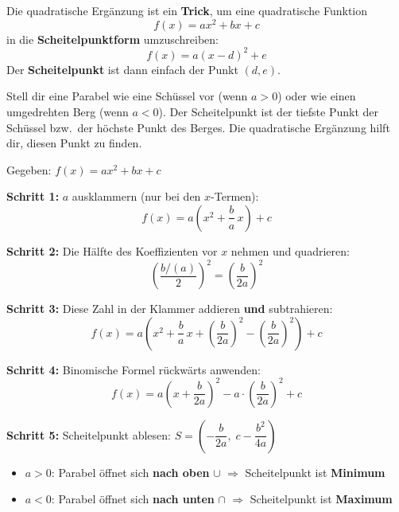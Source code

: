\documentclass[12pt,a4paper]{article}
\begin{document}
\begin{merkbox}[title={Was ist die quadratische Erg\"anzung?}]
Die quadratische Erg\"anzung ist ein \textbf{Trick}, um eine quadratische Funktion
\[
  f(x) = ax^2 + bx + c
\]
in die \textbf{Scheitelpunktform} umzuschreiben:
\[
  f(x) = a(x - d)^2 + e
\]
Der \textbf{Scheitelpunkt} ist dann einfach der Punkt $(d, e)$.
\end{merkbox}

\begin{analogie}
Stell dir eine Parabel wie eine Sch\"ussel vor (wenn $a > 0$) oder wie einen umgedrehten Berg (wenn $a < 0$). Der Scheitelpunkt ist der tiefste Punkt der Sch\"ussel bzw.\ der h\"ochste Punkt des Berges. Die quadratische Erg\"anzung hilft dir, diesen Punkt zu finden.
\end{analogie}

\begin{merkbox}[title={Rezept: Quadratische Erg\"anzung Schritt f\"ur Schritt}]
Gegeben: $f(x) = ax^2 + bx + c$

\textbf{Schritt 1:} $a$ ausklammern (nur bei den $x$-Termen):
\[
  f(x) = a\left(x^2 + \frac{b}{a}\,x\right) + c
\]

\textbf{Schritt 2:} Die H\"alfte des Koeffizienten vor $x$ nehmen und quadrieren:
\[
  \left(\frac{b/(a)}{2}\right)^2 = \left(\frac{b}{2a}\right)^2
\]

\textbf{Schritt 3:} Diese Zahl in der Klammer addieren \textbf{und} subtrahieren:
\[
  f(x) = a\left(x^2 + \frac{b}{a}\,x + \left(\frac{b}{2a}\right)^2 - \left(\frac{b}{2a}\right)^2\right) + c
\]

\textbf{Schritt 4:} Binomische Formel r\"uckw\"arts anwenden:
\[
  f(x) = a\left(x + \frac{b}{2a}\right)^2 - a\cdot\left(\frac{b}{2a}\right)^2 + c
\]

\textbf{Schritt 5:} Scheitelpunkt ablesen: $S = \left(-\dfrac{b}{2a},\; c - \dfrac{b^2}{4a}\right)$
\end{merkbox}

\begin{merkbox}[title={\"Offnung der Parabel}]
\begin{itemize}
  \item $a > 0$: Parabel \"offnet sich \textbf{nach oben} $\cup$ $\Rightarrow$ Scheitelpunkt ist \textbf{Minimum}
  \item $a < 0$: Parabel \"offnet sich \textbf{nach unten} $\cap$ $\Rightarrow$ Scheitelpunkt ist \textbf{Maximum}
\end{itemize}
\end{merkbox}
\end{document}
